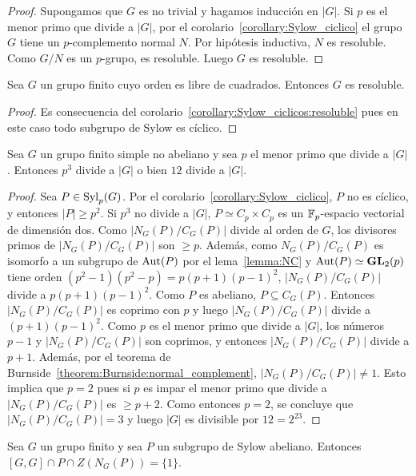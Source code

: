 \begin{proof}
	Supongamos que $G$ es no trivial y hagamos inducción en $|G|$. Si $p$ es el
	menor primo que divide a $|G|$, por el
	corolario~\ref{corollary:Sylow_ciclico} el grupo $G$ tiene un
	$p$-complemento normal $N$. Por hipótesis inductiva, $N$ es resoluble. Como
	$G/N$ es un $p$-grupo, es resoluble. Luego $G$ es resoluble.
\end{proof}

\begin{corollary}
	Sea $G$ un grupo finito cuyo orden es libre de cuadrados. Entonces $G$ es
	resoluble.
\end{corollary}

\begin{proof}
	Es consecuencia del corolario~\ref{corollary:Sylow_ciclicos:resoluble} pues
	en este caso todo subgrupo de Sylow es cíclico.  
\end{proof}

\begin{corollary}
	Sea $G$ un grupo finito simple no abeliano y sea $p$ el menor primo que
	divide a $|G|$. Entonces $p^3$ divide a $|G|$ o bien $12$ divide a $|G|$.
\end{corollary}

\begin{proof}
	Sea $P\in\mathrm{Syl}_p(G)$. Por el corolario~\ref{corollary:Sylow_ciclico}, $P$ no
	es cíclico, y entonces $|P|\geq p^2$. Si $p^3$ no divide a $|G|$, $P\simeq
	C_p\times C_p$ es un $\mathbb{F}_p$-espacio vectorial de dimensión dos. Como
	$|N_G(P)/C_G(P)|$ divide al orden de $G$, los divisores primos de
	$|N_G(P)/C_G(P)|$ son $\geq p$. Además, como $N_G(P)/C_G(P)$ es isomorfo a
	un subgrupo de $\operatorname{Aut}(P)$ por el lema~\ref{lemma:NC} y
	$\operatorname{Aut}(P)\simeq\mathbf{GL}_2(p)$ tiene orden $(p^2-1)(p^2-p)=p(p+1)(p-1)^2$,
	$|N_G(P)/C_G(P)|$ divide a $p(p+1)(p-1)^2$.  Como $P$ es abeliano,
	$P\subseteq C_G(P)$. Entonces $|N_G(P)/C_G(P)|$ es coprimo con $p$ y luego
	$|N_G(P)/C_G(P)|$ divide a $(p+1)(p-1)^2$. Como $p$ es el menor primo que
	divide a $|G|$, los números $p-1$ y $|N_G(P)/C_G(P)|$ son coprimos, y
	entonces $|N_G(P)/C_G(P)|$ divide a $p+1$.  Además, por el teorema de
	Burnside~\ref{theorem:Burnside:normal_complement}, $|N_G(P)/C_G(P)|\ne1$.
	Esto implica que $p=2$ pues si $p$ es impar el menor primo que divide a
	$|N_G(P)/C_G(P)|$ es $\geq p+2$.  Como entonces $p=2$, se concluye que
	$|N_G(P)/C_G(P)|=3$ y luego $|G|$ es divisible por $12=2^23$. 
\end{proof}

\begin{theorem}
	\label{theorem:[GG]PZNG(P)=1}
	Sea $G$ un grupo finito y sea $P$ un subgrupo de Sylow abeliano. Entonces 
	$[G,G]\cap P\cap Z(N_G(P))=\{1\}$.
\end{theorem}

